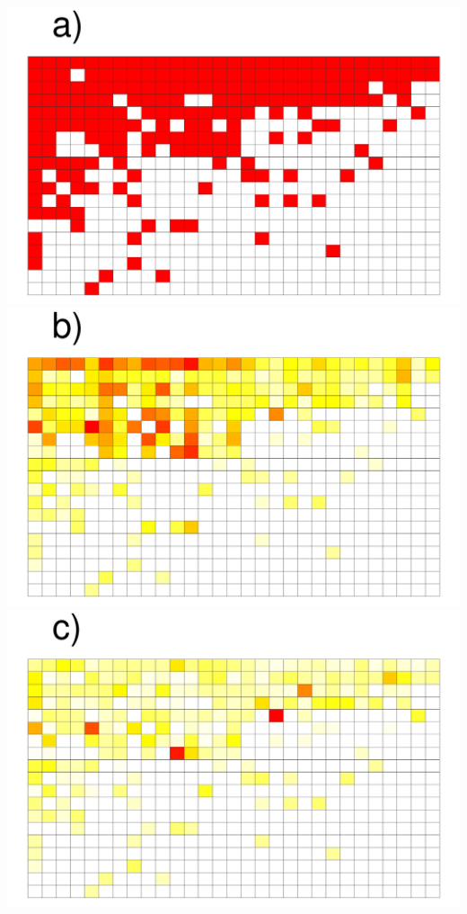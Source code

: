 \documentclass[pdftex]{nature}
\begin{document}
\vspace{3cm}

  \includegraphics[width=0.32\linewidth]{Figures/p89_binary.pdf}
  \includegraphics[width=0.32\linewidth]{Figures/p89_log_dual.pdf}
  \includegraphics[width=0.32\linewidth]{Figures/p89_pref_log_dual.pdf}
\end{document}
